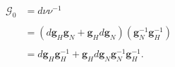 \begin{equation}
\begin{aligned}
\mathcal{G}_{0}&=d\nu \nu ^{-1}\\
\\
&=(d\mathbf{g}_{H}\mathbf{g}_{N}+\mathbf{g}_{H}d\mathbf{g}%
_{N})(\mathbf{g}_{N}^{-1}\mathbf{g}_{H}^{-1})\\
\\
&=d\mathbf{g}_{H}\mathbf{g}_{H}^{-1}+\mathbf{g}_{H}d\mathbf{g}_{N}\mathbf{g}_{N}^{-1}\mathbf{g}_{H}^{-1}.
\end{aligned}
\end{equation}

